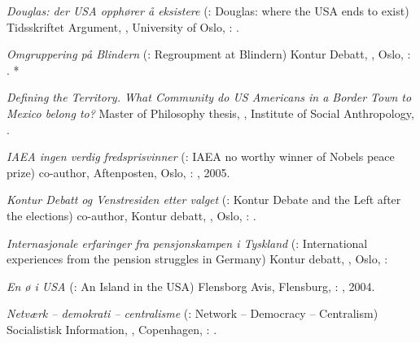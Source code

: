 \begin{itemize}
{\item \textit{Douglas: der USA opphører å eksistere} (\english: Douglas: where the USA ends to exist) Tidsskriftet Argument, , University of Oslo, \Norway: .

\item \textit{Omgruppering på Blindern} (\english: Regroupment at Blindern) Kontur Debatt, , Oslo, \Norway: . *
\item \textit{Defining the Territory. What Community do US Americans in a Border Town to Mexico belong to?} Master of Philosophy thesis, , Institute of Social Anthropology, \uio.
\item \textit{IAEA ingen verdig fredsprisvinner} (\english: IAEA no worthy winner of Nobels peace prize) co-author, Aftenposten, Oslo, \Norway: , 2005.
\item \textit{Kontur Debatt og Venstresiden etter valget} (\english: Kontur Debate and the Left after the elections) co-author, Kontur debatt, , Oslo, \Norway: .
\item \textit{Internasjonale erfaringer fra pensjonskampen i Tyskland} (\english: International experiences from the pension struggles in Germany) Kontur debatt, , Oslo, \Norway: 
\item \textit{En ø i USA} (\english: An Island in the USA) Flensborg Avis, Flensburg, \Germany: , 2004.

\item \textit{Netværk – demokrati – centralisme} (\english: Network -- Democracy -- Centralism) Socialistisk Information, , Copenhagen, \Denmark: .

}

\end{itemize}

